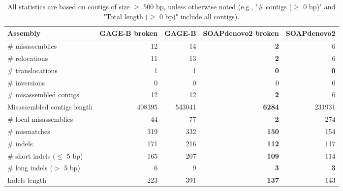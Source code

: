 \documentclass[12pt,a4paper]{article}
\begin{document}
\begin{table}[ht]
\begin{center}
\caption{All statistics are based on contigs of size $\geq$ 500 bp, unless otherwise noted (e.g., "\# contigs ($\geq$ 0 bp)" and "Total length ($\geq$ 0 bp)" include all contigs).}
\begin{tabular}{|l*{4}{|r}|}
\hline
Assembly & GAGE-B broken & GAGE-B & SOAPdenovo2 broken & SOAPdenovo2 \\ \hline
\# misassemblies & 12 & 14 & {\bf 2} & 6 \\ \hline
\hspace{5mm}\# relocations & 11 & 13 & {\bf 2} & 6 \\ \hline
\hspace{5mm}\# translocations & 1 & 1 & {\bf 0} & {\bf 0} \\ \hline
\hspace{5mm}\# inversions & 0 & 0 & 0 & 0 \\ \hline
\# misassembled contigs & 12 & 12 & {\bf 2} & 6 \\ \hline
Misassembled contigs length & 408395 & 543041 & {\bf 6284} & 231931 \\ \hline
\# local misassemblies & 44 & 77 & {\bf 2} & 274 \\ \hline
\# mismatches & 319 & 332 & {\bf 150} & 154 \\ \hline
\# indels & 171 & 216 & {\bf 112} & 117 \\ \hline
\hspace{5mm}\# short indels ($\leq$ 5 bp) & 165 & 207 & {\bf 109} & 114 \\ \hline
\hspace{5mm}\# long indels ($>$ 5 bp) & 6 & 9 & {\bf 3} & {\bf 3} \\ \hline
Indels length & 223 & 391 & {\bf 137} & 143 \\ \hline
\end{tabular}
\end{center}
\end{table}
\end{document}
